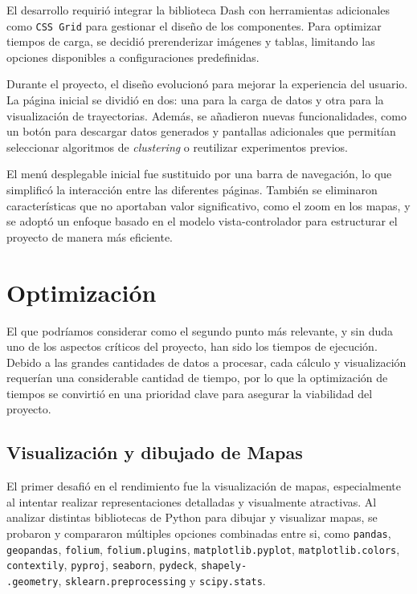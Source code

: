El desarrollo requirió integrar la biblioteca Dash con herramientas adicionales como \texttt{CSS Grid} para gestionar el diseño de los componentes. Para optimizar tiempos de carga, se decidió prerenderizar imágenes y tablas, limitando las opciones disponibles a configuraciones predefinidas.

Durante el proyecto, el diseño evolucionó para mejorar la experiencia del usuario. La página inicial se dividió en dos: una para la carga de datos y otra para la visualización de trayectorias. Además, se añadieron nuevas funcionalidades, como un botón para descargar datos generados y pantallas adicionales que permitían seleccionar algoritmos de \textit{clustering} o reutilizar experimentos previos.

El menú desplegable inicial fue sustituido por una barra de navegación, lo que simplificó la interacción entre las diferentes páginas. También se eliminaron características que no aportaban valor significativo, como el zoom en los mapas, y se adoptó un enfoque basado en el modelo vista-controlador para estructurar el proyecto de manera más eficiente.

\section{Optimización}

El que podríamos considerar como el segundo punto más relevante, y sin duda uno de los aspectos críticos del proyecto, han sido los tiempos de ejecución. Debido a las grandes cantidades de datos a procesar, cada cálculo y visualización requerían una considerable cantidad de tiempo, por lo que la optimización de tiempos se convirtió en una prioridad clave para asegurar la viabilidad del proyecto.

\subsection{Visualización y dibujado de Mapas}

El primer desafió en el rendimiento fue la visualización de mapas, especialmente al intentar realizar representaciones detalladas y visualmente atractivas. Al analizar distintas bibliotecas de Python para dibujar y visualizar mapas, se probaron y compararon múltiples opciones combinadas entre si, como \texttt{pandas}, \texttt{geopandas}, \texttt{folium}, \texttt{folium.plugins}, \texttt{matplotlib.pyplot}, \texttt{matplotlib.colors}, \texttt{contextily}, \texttt{pyproj}, \texttt{seaborn}, \texttt{pydeck}, \texttt{shapely-} \\ \texttt{.geometry}, \texttt{sklearn.preprocessing} y \texttt{scipy.stats}.


